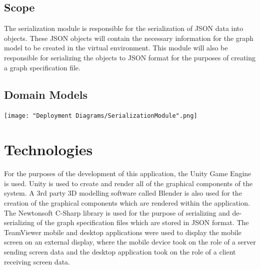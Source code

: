 \documentclass[12pt]{article}
\begin{document}
\subsection{Scope}
The serialization module is responsible for the serialization of JSON data into objects. These JSON objects will contain the necessary information for the graph model to be created in the virtual environment. This module will also be responsible for serializing the objects to JSON format for the purposes of creating a graph specification file. 
\subsection{Domain Models}

\texttt{[image: "Deployment Diagrams/SerializationModule".png]}

\section{Technologies}
For the purposes of the development of this application, the Unity Game Engine is used. Unity is used to create and render all of the graphical components of the system. A 3rd party 3D modelling software called Blender is also used for the creation of the graphical components which are rendered within the application. The Newtonsoft C-Sharp library is used for the purpose of serializing and de-serializing of the graph specification files which are stored in JSON format. The TeamViewer mobile and desktop applications were used to display the mobile screen on an external display, where the mobile device took on the role of a server sending screen data and the desktop application took on the role of a client receiving screen data.
\end{document}
